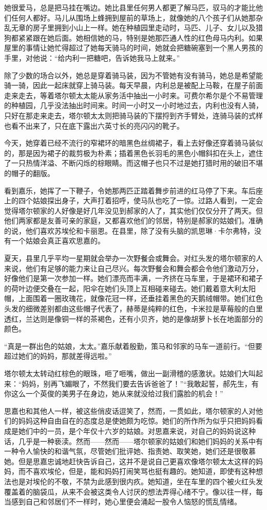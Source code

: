 \par 她很爱马，总是把马挂在嘴边。她比县里任何男人都更了解马匹，驭马的才能比他们任何人都好。马儿从围场上蜂拥到屋前的草场上，就像她的八个孩子们从她那杂乱无章的房子里拥到小山上一样。她在种植园里走动时，马匹、儿子、女儿以及猎狗都紧紧跟在她后面。她相信她的马，特别是她那匹通人性的红色母马内利。如果屋里的事情让她忙得超过了她每天骑马的时间，她就会把糖碗塞到一个黑人男孩的手里，对他说：“给内利一把糖吧，告诉她我马上就来。”
\par 除了少数的场合以外，她总是穿着骑马装，因为不管她有没有骑马，她总是希望能骑一骑，因此一起床就穿上骑马装。每天早晨，内利总是被配上马鞍，在屋子前面走来走去，等着塔尔顿太太能从家务活中抽出一小时来。可费尔希尔是个不易管理的种植园，几乎没法抽出时间来。时间一小时又一小时地过去，内利也没有人骑，只好在那走来走去，塔尔顿太太则把骑马装的下摆捋到齐手臂处，连骑马装的式样也看不出来了，只在底下露出六英寸长的亮闪闪的靴子。
\par 今天，她穿着已经不流行的窄裙环的暗黑色丝绸裙子，看上去好像还穿着骑马装似的，那是因为裙子的裁剪极为朴素；插着黑色长羽毛的黑色小帽斜扣在头上，遮住了一只热情洋溢、不断闪烁的棕眼睛。而这帽子也只不过是她打猎时用的破旧不堪的帽子的翻版。
\par 看到嘉乐，她挥了一下鞭子，令她那两匹正踏着舞步前进的红马停了下来。车后座上的四个姑娘探出身子，大声打着招呼，使马队也吃了一惊。过路人看到，一定会觉得塔尔顿家的人好像是好几年没见到郝家的人了，其实他们仅仅分开了两天。但他们两家都是友善可亲的家庭，又都喜欢他们的邻居，特别是郝家的姑娘们。准确的说，他们喜欢苏埃伦和卡丽恩。在县里，除了没有头脑的凯思琳·卡尔弗特，没有一个姑娘会真正喜欢思嘉的。
\par 夏天，县里几乎平均一星期就会举办一次野餐会或舞会。对红头发的塔尔顿家的人来说，他们有足够的能力来让自己尽兴。每次野餐会和舞会都会令他们激动万分，好像他们是第一次参加一样。她们漂亮而丰满，一齐挤在马车里，于是裙环和裙子的荷叶边便交叠在一起，阳伞在她们头顶上互相碰来碰去。她们戴着意大利太阳帽，上面围着一圈玫瑰花，就像花冠一样，还垂挂着黑色的天鹅绒帽带。她们红色头发的细微差别都由这些帽子代表了，赫蒂是纯粹的红色，卡米拉是草莓般的白里透红，兰达则是像铜一样的茶褐色，还有小贝齐，她的是像胡萝卜长在地面部分的颜色。
\par “真是一群出色的姑娘，太太。”嘉乐献着殷勤，策马和邻家的马车一道前行。“但要超过她们的妈妈，那就差得远啦。”
\par 塔尔顿太太转动红棕色的眼珠，咂了咂嘴，做出一副滑稽的感激状。姑娘们大叫起来：“妈妈，别再飞媚眼了，不然我们要去告诉爸爸了！”“我敢起誓，郝先生，有你这么一个英俊的美男子在身边，她从来就没给过我们露脸的机会！”
\par 思嘉也和其他人一样，被这些俏皮话逗笑了，然而，一贯如此，塔尔顿家的人对他们的妈妈这种自由自在的态度总是使她颇为吃惊。她们的所作所为似乎只把妈妈看成是她们中的一员，是个年仅十六岁的姑娘。对思嘉来说，对自己的妈妈说这种话，几乎是一种亵渎。然而——然而——塔尔顿家的姑娘们和她们妈妈的关系中有一种令人愉快的和谐气氛，尽管她们批评她、指责她、取笑她，她们还是很敬慕她。但是思嘉忠诚地赶快告诉自己，这并不是说自己更喜欢像塔尔顿太太这样的妈妈，而不喜欢埃伦，但是，能和妈妈打闹笑骂也挺有趣的。她知道，即使有这种想法也是对埃伦的不敬，不禁为此感到很内疚。她知道，坐在车里的四个被火红头发覆盖着的脑袋瓜，从来不会被这类令人讨厌的想法弄得心绪不宁。像以往一样，每当感到自己和邻居们不一样时，她心里便会涌起一股令人恼怒的慌乱情绪。
